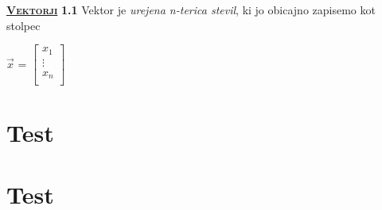 \documentclass{article}
\begin{document}
\begin{multicols}{3}

\section{}
\textsc{\LARGE \bf \underline{Vektorji}}\bigskip
\newline
\textbf{1.1} Vektor je \textit{urejena n-terica stevil}, ki jo obicajno
zapisemo kot stolpec\smallskip
\begin{center}
    $\vec{x}$ =
    $\begin{bmatrix}
        x_{1}\\
        \vdots \\
        x_{n}\\
    \end{bmatrix}$
\end{center}
\section{Test}
\lipsum
\section{Test}
\lipsum

\end{multicols}
\end{document}
